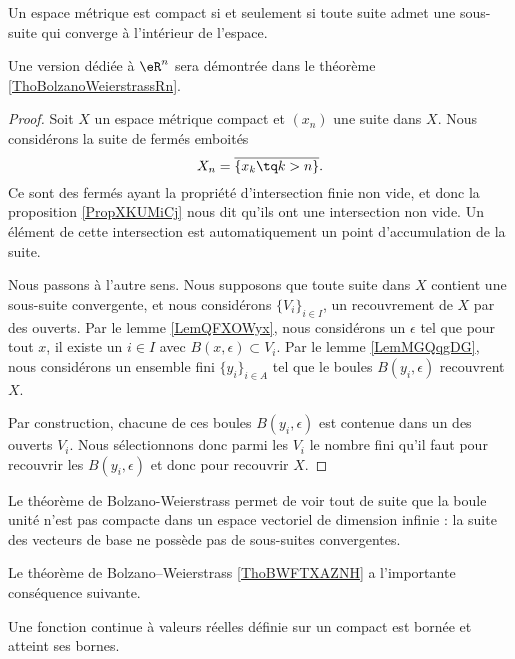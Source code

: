 \begin{theorem}\label{ThoBWFTXAZNH}
    Un espace métrique est compact si et seulement si toute suite admet une sous-suite qui converge à l'intérieur de l'espace.
\end{theorem}
Une version dédiée à \( \eR^n\) sera démontrée dans le théorème \ref{ThoBolzanoWeierstrassRn}.

\begin{proof}
   Soit \( X\) un espace métrique compact et \( (x_n)\) une suite dans \( X\). Nous considérons la suite de fermés emboités
   \begin{equation}
       X_n=\overline{ \{ x_k\tq k>n \} }.
   \end{equation}
   Ce sont des fermés ayant la propriété d'intersection finie non vide, et donc la proposition \ref{PropXKUMiCj} nous dit qu'ils ont une intersection non vide. Un élément de cette intersection est automatiquement un point d'accumulation de la suite.

   Nous passons à l'autre sens. Nous supposons que toute suite dans \( X\) contient une sous-suite convergente, et nous considérons \( \{ V_i \}_{i\in I}\), un recouvrement de \( X\) par des ouverts. Par le lemme \ref{LemQFXOWyx}, nous considérons un \( \epsilon\) tel que pour tout \( x\), il existe un \( i\in I\) avec \( B(x,\epsilon)\subset V_i\). Par le lemme \ref{LemMGQqgDG}, nous considérons un ensemble fini \( \{ y_i \}_{i\in A}\) tel que le boules \( B(y_i,\epsilon)\) recouvrent \( X\).

   Par construction, chacune de ces boules \( B(y_i,\epsilon)\) est contenue dans un des ouverts \( V_i\). Nous sélectionnons donc parmi les \( V_i\) le nombre fini qu'il faut pour recouvrir les \( B(y_i,\epsilon)\) et donc pour recouvrir \( X\).
\end{proof}

\begin{example}\label{ExEFYooTILPDk}
    Le théorème de Bolzano-Weierstrass permet de voir tout de suite que la boule unité n'est pas compacte dans un espace vectoriel de dimension infinie : la suite des vecteurs de base ne possède pas de sous-suites convergentes.
\end{example}

Le théorème de Bolzano–Weierstrass \ref{ThoBWFTXAZNH} a l'importante conséquence suivante.
\begin{theorem}[Weierstrass]		\label{ThoWeirstrassRn}
	Une fonction continue à valeurs réelles définie sur un compact est bornée et atteint ses bornes.
\end{theorem}

